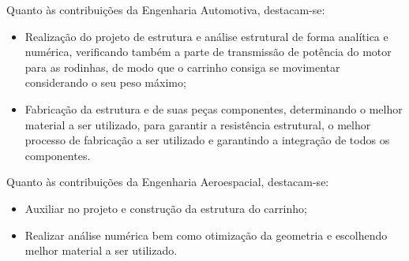 Quanto às contribuições da Engenharia Automotiva, destacam-se:

\begin{itemize}
    \item Realização do projeto de estrutura e análise estrutural de forma analítica e numérica, verificando também a parte de transmissão de potência do motor para as rodinhas, de modo que o carrinho consiga se movimentar considerando o seu peso máximo;
    \item Fabricação da estrutura e de suas peças componentes, determinando o melhor material a ser utilizado, para garantir a resistência estrutural, o melhor processo de fabricação a ser utilizado e garantindo a integração de todos os componentes.
\end{itemize}

Quanto às contribuições da Engenharia Aeroespacial, destacam-se:

\begin{itemize}
    \item Auxiliar no projeto e construção da estrutura do carrinho;
    \item Realizar análise numérica bem como otimização da geometria e escolhendo melhor material a ser utilizado.
\end{itemize}






